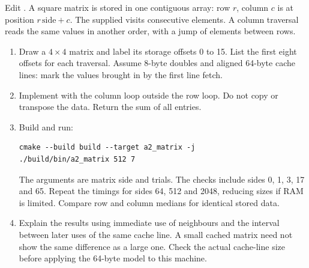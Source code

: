 Edit . A square matrix is stored in one contiguous array:
row $r$, column $c$ is at position $r\,\mathrm{side}+c$. The supplied
 visits consecutive elements. A column traversal reads the
same values in another order, with a jump of  elements between rows.
\begin{enumerate}
\item Draw a $4\times4$ matrix and label its storage offsets 0 to 15. List the
first eight offsets for each traversal. Assume 8-byte doubles and aligned
64-byte cache lines: mark the values brought in by the first line fetch.
\item Implement  with the column loop outside the row
loop. Do not copy or transpose the data. Return the sum of all entries.
\item Build and run:
\begin{lstlisting}[style=shell]
cmake --build build --target a2_matrix -j
./build/bin/a2_matrix 512 7
\end{lstlisting}
The arguments are matrix side and trials. The checks include sides 0, 1, 3, 17
and 65. Repeat the timings for sides 64, 512 and 2048, reducing sizes if RAM is
limited. Compare row and column medians for identical stored data.
\item Explain the results using immediate use of neighbours and the interval
between later uses of the same cache line. A small cached matrix need not show
the same difference as a large one. Check the actual cache-line size before
applying the 64-byte model to this machine.
\end{enumerate}


